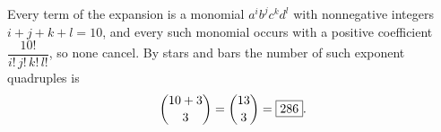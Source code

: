 Every term of the expansion is a monomial $a^ib^jc^kd^l$ with nonnegative integers $i+j+k+l=10$, and every such monomial occurs with a positive coefficient $\dfrac{10!}{i!\,j!\,k!\,l!}$, so none cancel. By stars and bars the number of such exponent quadruples is
\[
\dbinom{10+3}{3}=\dbinom{13}{3}=\boxed{286}.
\]
